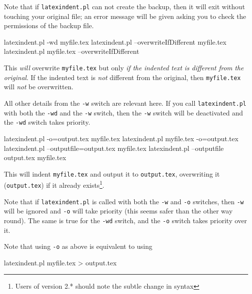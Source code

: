  Note that if \texttt{latexindent.pl} can not create the backup, then it will exit
 without touching your original file; an error message will be given asking you to check
 the permissions of the backup file.


 \begin{commandshell}
latexindent.pl -wd myfile.tex
latexindent.pl --overwriteIfDifferent myfile.tex
latexindent.pl myfile.tex --overwriteIfDifferent
\end{commandshell}

 This \emph{will} overwrite \texttt{myfile.tex} but only \emph{if the indented text is
 different from the original}. If the indented text is \emph{not} different from the
 original, then \texttt{myfile.tex} will \emph{not} be overwritten.

 All other details from the \texttt{-w} switch are relevant here. If you call
 \texttt{latexindent.pl} with both the \texttt{-wd} and the \texttt{-w} switch, then the
 \texttt{-w} switch will be deactivated and the \texttt{-wd} switch takes priority.


 \begin{commandshell} 
latexindent.pl -o=output.tex myfile.tex
latexindent.pl myfile.tex -o=output.tex 
latexindent.pl --outputfile=output.tex myfile.tex
latexindent.pl --outputfile output.tex myfile.tex
\end{commandshell}

 This will indent \texttt{myfile.tex} and output it to \texttt{output.tex}, overwriting
 it (\texttt{output.tex}) if it already exists\footnote{Users of version 2.* should note
 the subtle change in syntax}.

 Note that if \texttt{latexindent.pl} is called with both the \texttt{-w} and \texttt{-o}
 switches, then \texttt{-w} will be ignored and \texttt{-o} will take priority (this
 seems safer than the other way round). The same is true for the \texttt{-wd} switch, and
 the \texttt{-o} switch takes priority over it.

 Note that using \texttt{-o} as above is equivalent to using

 \begin{commandshell}
latexindent.pl myfile.tex > output.tex
\end{commandshell}

